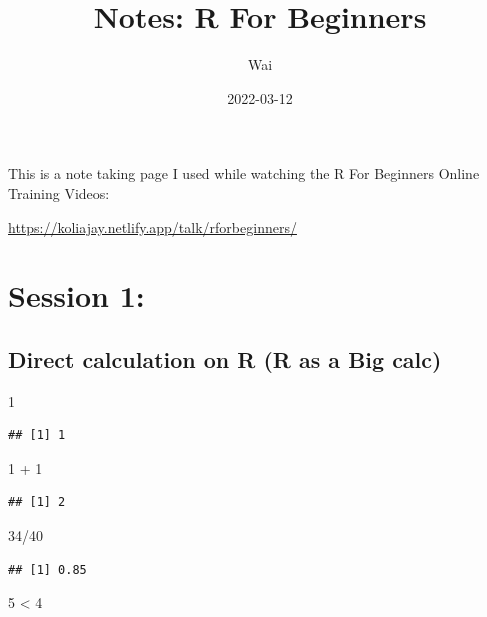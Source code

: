 \documentclass[
]{article}
\title{Notes: R For Beginners}
\author{Wai}
\date{2022-03-12}
\newenvironment{Shaded}{\begin{snugshade}}{\end{snugshade}}
\newcommand{\DecValTok}[1]{\textcolor[rgb]{0.00,0.00,0.81}{#1}}
\newcommand{\SpecialCharTok}[1]{\textcolor[rgb]{0.00,0.00,0.00}{#1}}
\begin{document}
\maketitle

This is a note taking page I used while watching the R For Beginners
Online Training Videos:

\url{https://koliajay.netlify.app/talk/rforbeginners/}

\hypertarget{session-1}{%
\section{Session 1:}\label{session-1}}

\hypertarget{direct-calculation-on-r-r-as-a-big-calc}{%
\subsection{Direct calculation on R (R as a Big
calc)}\label{direct-calculation-on-r-r-as-a-big-calc}}

\begin{Shaded}
\begin{Highlighting}[]
\DecValTok{1}
\end{Highlighting}
\end{Shaded}

\begin{verbatim}
## [1] 1
\end{verbatim}

\begin{Shaded}
\begin{Highlighting}[]
\DecValTok{1} \SpecialCharTok{+} \DecValTok{1}
\end{Highlighting}
\end{Shaded}

\begin{verbatim}
## [1] 2
\end{verbatim}

\begin{Shaded}
\begin{Highlighting}[]
\DecValTok{34}\SpecialCharTok{/}\DecValTok{40}
\end{Highlighting}
\end{Shaded}

\begin{verbatim}
## [1] 0.85
\end{verbatim}

\begin{Shaded}
\begin{Highlighting}[]
\DecValTok{5} \SpecialCharTok{\textless{}} \DecValTok{4}
\end{Highlighting}
\end{Shaded}
\end{document}
